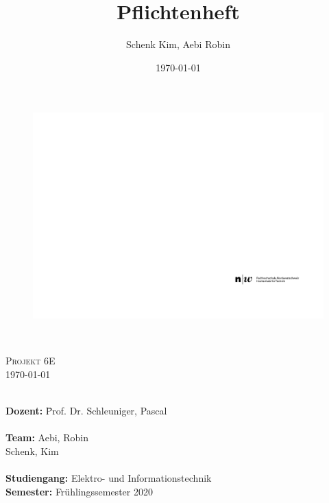 \documentclass[final]{fhnwreport}       %
\title{Pflichtenheft}  		        %
\author{Schenk Kim, Aebi Robin}      				    %
\date{\today}          				   %
\begin{document}
\thispagestyle{empty}
	\begin{figure}
		 \vspace*{-\topskip}\vspace*{-\headsep}
		\includegraphics[scale=1]{graphics/fhnw_ht_logo_de.pdf}
	\end{figure}
	\begin{center}
		\vspace*{2cm}
		{\huge{\textbf{\thetitle}}}\\
		\vspace*{0.5cm}
		
		{\scshape\Large Projekt 6E \\} \Large{\today}
		\vfill
		\begin{normalsize}
			{\begin{tabbing}
					
					\\[0.8cm]
					\textbf{Dozent:} \hspace{5cm}
					\=Prof. Dr. Schleuniger, Pascal\\
					
					
					\\[0.4cm]
					
					\textbf{Team:} \>Aebi, Robin \\ \>Schenk, Kim \\
					\\[0.8cm]
					\textbf{Studiengang:} \>Elektro- und Informationstechnik
					\\[0.8cm]	\textbf{Semester:} \>Frühlingssemester 2020
			\end{tabbing}}
		\end{normalsize}
		\vfill
	\end{center}
\clearpage
\end{document}
